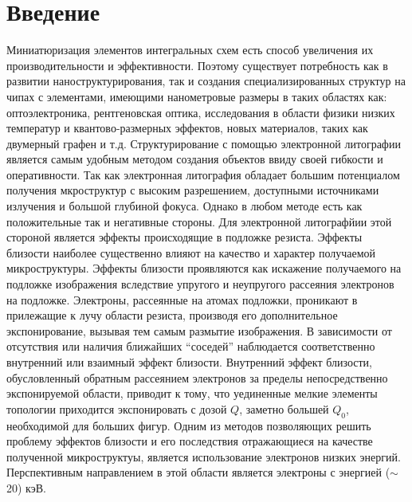 \chapter*{Введение}
\vspace*{1cm}

Миниатюризация элементов интегральных схем есть способ увеличения их
производительности и эффективности. Поэтому существует потребность как
в развитии наноструктурирования, так и создания специализированных
структур на чипах с элементами, имеющими нанометровые размеры в таких
областях как: оптоэлектроника, рентгеновская оптика, исследования в
области физики низких температур и квантово-размерных эффектов, новых
материалов, таких как двумерный графен и т.д.
Структурирование с помощью электронной литографии является самым
удобным методом создания объектов ввиду своей гибкости и оперативности.
Так как электронная литография обладает большим потенциалом получения 
мкроструктур с высоким разрешением, доступными источниками излучения и
большой глубиной фокуса. Однако в любом методе есть как положительные 
так и негативные стороны. Для электронной литографйии этой стороной 
является эффекты происходящие в подложке резиста. Эффекты близости
наиболее существенно влияют на качество и характер получаемой
микроструктуры. Эффекты близости проявляются как искажение получаемого 
на подложке изображения вследствие упругого и неупругого рассеяния 
электронов на подложке. Электроны, рассеянные на атомах подложки, 
проникают в прилежащие к лучу области резиста, производя его 
дополнительное экспонирование, вызывая тем самым размытие изображения.
В зависимости от отсутствия или наличия ближайших “соседей” наблюдается 
соответственно внутренний или взаимный эффект близости. Внутренний эффект 
близости, обусловленный обратным рассеянием электронов за пределы 
непосредственно экспонируемой области, приводит к тому, что уединенные 
мелкие элементы топологии приходится экспонировать с дозой $Q$, заметно 
большей $Q_0$, необходимой для больших фигур. 
Одним из методов позволяющих решить проблему эффектов близости и
его последствия отражающиеся на качестве полученной микроструктуы, 
является использование электронов низких энергий. Перспективным 
направлением в этой области является электроны с энергией (\(\sim\)20) кэВ.









